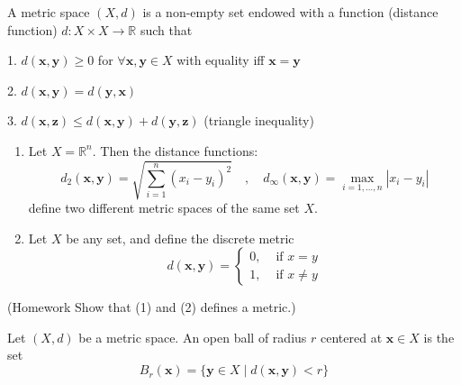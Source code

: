 \begin{definition} \label{def:metric_space} A metric space \((X,d)\) is a non-empty set endowed with a function (distance function) \(d : X \times  X \rightarrow  \mathbb{R}\) such that

1. \(d\left( {\mathbf{x},\mathbf{y}}\right)  \geq  0\) for \(\forall \mathbf{x},\mathbf{y} \in  X\) with equality iff \(\mathbf{x} = \mathbf{y}\)

2. \(d\left( {\mathbf{x},\mathbf{y}}\right)  = d\left( {\mathbf{y},\mathbf{x}}\right)\)

3. \(d\left( {\mathbf{x},\mathbf{z}}\right)  \leq  d\left( {\mathbf{x},\mathbf{y}}\right)  + d\left( {\mathbf{y},\mathbf{z}}\right)\) (triangle inequality)
\end{definition}

\begin{example} \begin{enumerate}
    \item Let \(X = {\mathbb{R}}^{n}\). Then the distance functions:
\[
{d}_{2}\left( {\mathbf{x},\mathbf{y}}\right)  = \sqrt{\mathop{\sum }\limits_{{i = 1}}^{n}{\left( {x}_{i}- {y}_{i}\right) }^{2}}
\quad, \quad {d}_{\infty }\left( {\mathbf{x},\mathbf{y}}\right)  = \mathop{\max }\limits_{{i = 1,\ldots,n}}\left| {{x}_{i}- {y}_{i}}\right|
\]
define two different metric spaces of the same set $X$.

\item Let \(X\) be any set, and define the discrete metric
\[
d\left( {\mathbf{x},\mathbf{y}}\right)  = \left\{  \begin{array}{ll} 0, & \text{ if }x = y \\  1, & \text{ if }x \neq  y \end{array}\right.
\]
\end{enumerate}
(Homework Show that (1) and (2) defines a metric.)
\end{example}

\begin{definition} Let $(X,d)$ be a metric space. An open ball of radius \(r\) centered at \(\mathbf{x} \in  X\) is the set
\[
{B}_{r}\left( \mathbf{x}\right)  = \{ \mathbf{y} \in  X \mid  d\left( {\mathbf{x},\mathbf{y}}\right)  < r\}
\]
\end{definition}

